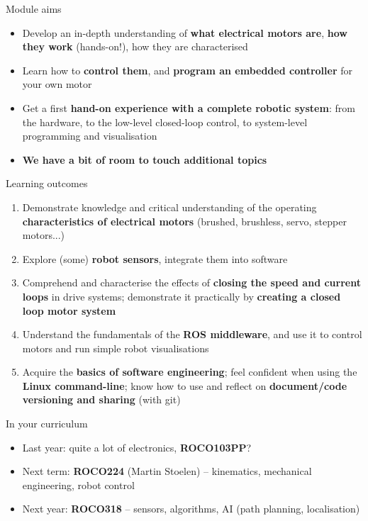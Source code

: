 \documentclass[compress]{beamer}
\begin{document}


\begin{frame}{Module aims}
    \begin{itemize}
        \item<+-> Develop an in-depth understanding of \textbf{what electrical motors are},
            \textbf{how they work} (hands-on!), how they are characterised
        \item<+-> Learn how to \textbf{control them}, and \textbf{program an embedded controller}
            for your own motor
        \item<+-> Get a first \textbf{hand-on experience with a complete robotic system}:
            from the hardware, to the low-level closed-loop control, to
            system-level programming and visualisation
        \item<+-> \textbf{We have a bit of room to touch additional topics}
    \end{itemize}
\end{frame}

\begin{frame}{Learning outcomes}
    \begin{enumerate}
        \item<+-> Demonstrate knowledge and critical understanding of the operating
            \textbf{characteristics of electrical motors} (brushed, brushless,
            servo, stepper motors...)
        \item<+-> Explore (some) \textbf{robot sensors}, integrate them into software
        \item<+-> Comprehend and characterise the effects of \textbf{closing the speed and current
            loops} in drive systems; demonstrate it practically by \textbf{creating a
            closed loop motor system}
        \item<+-> Understand the fundamentals of the \textbf{ROS middleware},
            and use it to control motors and run simple robot visualisations
        \item<+-> Acquire the \textbf{basics of software engineering}; feel
            confident when using the \textbf{Linux command-line}; know how to
            use and reflect on \textbf{document/code versioning and sharing}
            (with git)

    \end{enumerate}
\end{frame}

\begin{frame}{In your curriculum}
    \begin{itemize}
        \item Last year: quite a lot of electronics, \textbf{ROCO103PP}?
        \item Next term: \textbf{ROCO224} (Martin Stoelen) -- kinematics, mechanical engineering,
            robot control
        \item Next year: \textbf{ROCO318} -- sensors, algorithms, AI (path
            planning, localisation)
    \end{itemize}
\end{frame}
\end{document}
